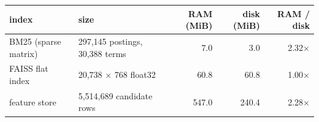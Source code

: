 \begin{tabular}{@{}llrrr@{}}
\toprule
index & size & RAM (MiB) & disk (MiB) & RAM / disk \\
\midrule
BM25 (sparse matrix) & 297,145 postings, 30,388 terms & 7.0 & 3.0 & 2.32$\times$ \\
FAISS flat index & 20,738 $\times$ 768 float32 & 60.8 & 60.8 & 1.00$\times$ \\
feature store & 5,514,689 candidate rows & 547.0 & 240.4 & 2.28$\times$ \\
\bottomrule
\end{tabular}
